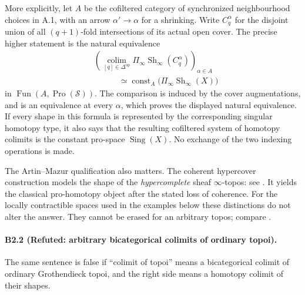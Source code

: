 More explicitly, let $A$ be the cofiltered category of synchronized
neighbourhood choices in A.1, with an arrow $\alpha'\to\alpha$ for
a shrinking. Write $C_q^\alpha$ for the disjoint union of all
$(q+1)$-fold intersections of its actual open cover. The precise
higher statement is the natural equivalence
\[
 \begin{aligned}
 &\left(\operatorname*{colim}_{[q]\in\Delta^{\mathrm{op}}}
       \Pi_\infty\operatorname{Sh}_\infty(C_q^\alpha)\right)_{\alpha\in A}
 \\
 &\hspace{3em}\simeq
 \operatorname{const}_A\bigl(\Pi_\infty\operatorname{Sh}_\infty(X)\bigr)
 \end{aligned}
 \tag{B2.2a}
\]
in $\operatorname{Fun}(A,\operatorname{Pro}(\mathcal S))$.
The comparison is induced by the cover augmentations, and is an
equivalence at every $\alpha$, which proves the displayed natural
equivalence. If every shape in this formula is represented by the
corresponding singular homotopy type, it also says that the resulting
cofiltered system of homotopy colimits is the constant pro-space
$\operatorname{Sing}(X)$. No exchange of the two indexing operations
is made.

The Artin--Mazur qualification also matters. The coherent hypercover
construction models the shape of the \emph{hypercomplete} sheaf
$\infty$-topos: see \cite[Proposition 5.1]{HoyoisGalois}. It yields
the classical pro-homotopy object after the stated loss of coherence.
For the locally contractible spaces used in the examples below these
distinctions do not alter the answer. They cannot be erased for an
arbitrary topos; compare \cite[Example 7.1.6.9]{LurieHTT}.

\paragraph{B2.2 (Refuted: arbitrary bicategorical colimits of ordinary topoi).}
The same sentence is false if ``colimit of topoi'' means a bicategorical
colimit of ordinary Grothendieck topoi, and the right side means a
homotopy colimit of their shapes.

